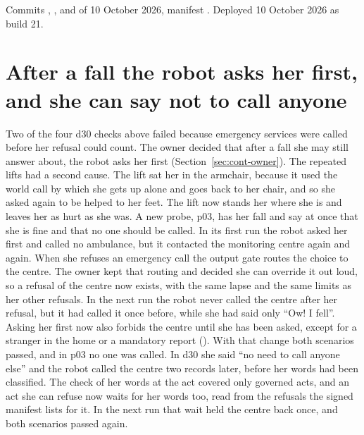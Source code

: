 Commits , ,  and  of 10 October 2026,
manifest .
Deployed 10 October 2026 as build 21.

\section{After a fall the robot asks her first, and she can say not to call anyone}\label{sec:log-askfirst}

Two of the four d30 checks above failed because emergency services were called before her refusal
could count.
The owner decided that after a fall she may still answer about, the robot asks her first
(Section~\ref{sec:cont-owner}).
The repeated lifts had a second cause.
The lift sat her in the armchair, because it used the world call by which she gets up alone and
goes back to her chair, and so she asked again to be helped to her feet.
The lift now stands her where she is and leaves her as hurt as she was.
A new probe, p03, has her fall and say at once that she is fine and that no one should be called.
In its first run the robot asked her first and called no ambulance, but it contacted the
monitoring centre again and again.
When she refuses an emergency call the output gate routes the choice to the centre.
The owner kept that routing and decided she can override it out loud, so a refusal of the centre
now exists, with the same lapse and the same limits as her other refusals.
In the next run the robot never called the centre after her refusal, but it had called it once
before, while she had said only ``Ow! I fell''.
Asking her first now also forbids the centre until she has been asked, except for a stranger in
the home or a mandatory report ().
With that change both scenarios passed, and in p03 no one was called.
In d30 she said ``no need to call anyone else'' and the robot called the centre two records later,
before her words had been classified.
The check of her words at the act covered only governed acts, and an act she can refuse now waits
for her words too, read from the refusals the signed manifest lists for it.
In the next run that wait held the centre back once, and both scenarios passed again.
